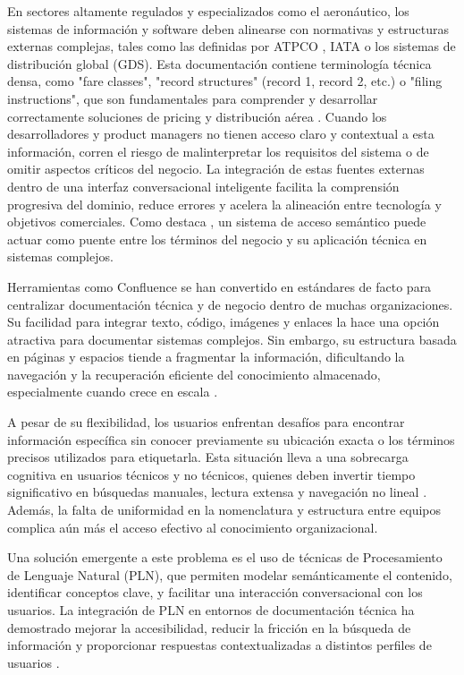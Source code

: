 En sectores altamente regulados y especializados como el aeronáutico, los sistemas de información y software deben alinearse con normativas y estructuras externas complejas, tales como las definidas por ATPCO \parencite{atpco2022}, IATA o los sistemas de distribución global (GDS). Esta documentación contiene terminología técnica densa, como "fare classes", "record structures" (record 1, record 2, etc.) o "filing instructions", que son fundamentales para comprender y desarrollar correctamente soluciones de pricing y distribución aérea \parencite{atpco2022}.
Cuando los desarrolladores y product managers no tienen acceso claro y contextual a esta información, corren el riesgo de malinterpretar los requisitos del sistema o de omitir aspectos críticos del negocio. La integración de estas fuentes externas dentro de una interfaz conversacional inteligente facilita la comprensión progresiva del dominio, reduce errores y acelera la alineación entre tecnología y objetivos comerciales. Como destaca \parencite{sriraman2021semantic}, un sistema de acceso semántico puede actuar como puente entre los términos del negocio y su aplicación técnica en sistemas complejos.

Herramientas como Confluence se han convertido en estándares de facto para centralizar documentación técnica y de negocio dentro de muchas organizaciones. Su facilidad para integrar texto, código, imágenes y enlaces la hace una opción atractiva para documentar sistemas complejos. Sin embargo, su estructura basada en páginas y espacios tiende a fragmentar la información, dificultando la navegación y la recuperación eficiente del conocimiento almacenado, especialmente cuando crece en escala \parencite{morville2006ambient}.

A pesar de su flexibilidad, los usuarios enfrentan desafíos para encontrar información específica sin conocer previamente su ubicación exacta o los términos precisos utilizados para etiquetarla. Esta situación lleva a una sobrecarga cognitiva en usuarios técnicos y no técnicos, quienes deben invertir tiempo significativo en búsquedas manuales, lectura extensa y navegación no lineal \parencite{white2016content}. Además, la falta de uniformidad en la nomenclatura y estructura entre equipos complica aún más el acceso efectivo al conocimiento organizacional.

Una solución emergente a este problema es el uso de técnicas de Procesamiento de Lenguaje Natural (PLN), que permiten modelar semánticamente el contenido, identificar conceptos clave, y facilitar una interacción conversacional con los usuarios. La integración de PLN en entornos de documentación técnica ha demostrado mejorar la accesibilidad, reducir la fricción en la búsqueda de información y proporcionar respuestas contextualizadas a distintos perfiles de usuarios \parencite{jurafsky2023speech}.

